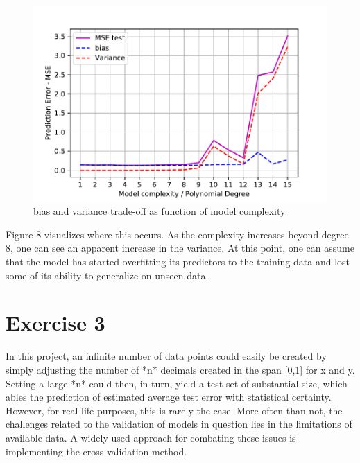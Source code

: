 \documentclass[11pt, a4paper]{article}
\begin{document}



\begin{figure}[h]
  \centering
  \includegraphics[scale=0.75]{figures/EX2_model_complexity_using_bootstrap_function.pdf}
  \caption{\label{fig:?}bias and variance trade-off as function of model complexity}
\end{figure}

Figure 8 visualizes where this occurs. As the complexity increases beyond degree 8, one can see an apparent increase in the variance.  At this point, one can assume that the model has started overfitting its predictors to the training data and lost some of its ability to generalize on unseen data.


\section*{Exercise 3}
In this project, an infinite number of data points could easily be created by simply adjusting the number of *n* decimals created in the span [0,1] for x and y. Setting a large *n* could then, in turn, yield a test set of substantial size, which ables the prediction of estimated average test error with statistical certainty. However, for real-life purposes, this is rarely the case. More often than not, the challenges related to the validation of models in question lies in the limitations of available data.  A widely used approach for combating these issues is implementing the cross-validation method.
\end{document}
